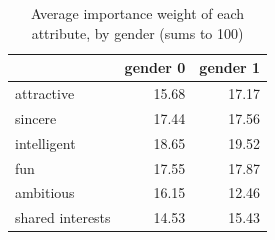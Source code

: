 \begin{table}[htbp]
\centering
\caption{Average importance weight of each attribute, by gender (sums to 100)}
\label{tab:q2_attribute_weights}
\begin{tabular}{lrr}
\toprule
 & gender 0 & gender 1 \\
\midrule
attractive & 15.68 & 17.17 \\
sincere & 17.44 & 17.56 \\
intelligent & 18.65 & 19.52 \\
fun & 17.55 & 17.87 \\
ambitious & 16.15 & 12.46 \\
shared interests & 14.53 & 15.43 \\
\bottomrule
\end{tabular}
\end{table}
